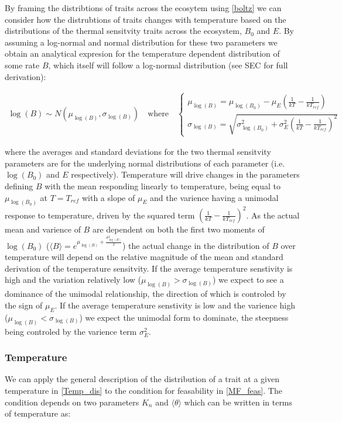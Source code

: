 \documentclass{article}
\begin{document}
By framing the distribtions of traits across the ecosytem using \cref{boltz} we can consider how the distrubtions of traits changes with temperature based on the distributions of the thermal sensitvity traits across the ecosystem, $B_0$ and $E$. By assuming a log-normal and normal distribution for these two parameters we obtain an analytical expresion for the temperature dependent distribution of some rate $B$, which itself will follow a log-normal distribution (see SEC for full derivation):

\begin{align}
  \log(B) \sim N(\mu_{\log(B)},\sigma_{\log(B)}) \quad \text{where} \quad
    \begin{cases}
      \mu_{\log(B)} = \mu_{\log(B_0)} - \mu_E \left(\frac{1}{k T} - \frac{1}{k T_{ref}} \right)
      \\
      \sigma_{\log(B)} =\sqrt{\sigma_{\log(B_0)}^2 + \sigma_E^2 \left(\frac{1}{kT} - \frac{1}{kT_{ref}} \right)^2} \label{Temp_dis}
      \end{cases}
\end{align}

where the averages and standard deviations for the two thermal sensitvity parameters are for the underlying normal distributions of each parameter (i.e. $\log(B_0)$ and $E$ respectively). Temperature will drive changes in the parameters defining $B$ with the mean responding linearly to temperature, being equal to $\mu_{\log(B_0)}$ at $T = T_{ref}$ with a slope of $\mu_E$ and the varience having a unimodal response to temperature, driven by the squared term $\left(\frac{1}{kT} - \frac{1}{kT_{ref}} \right)^2$. As the actual mean and varience of $B$ are dependent on both the first two moments of $\log(B_0)$ ($\langle B \rangle = e^{\mu_{\log(B)} + \frac{\sigma_{\log(B)}^2}{2} }$)  the actual change in the distribution of $B$ over temperature will depend on the relative magnitude of the mean and standard derivation of the temperature sensitvity. If the average temperature senstivity is high and the variation relatively low ($\mu_{\log(B)} > \sigma_{\log(B)}$) we expect to see a dominance of the unimodal relationship, the direction of which is controled by the sign of $\mu_E$. If the average temperature senstivity is low and the varience high ($\mu_{\log(B)} < \sigma_{\log(B)}$) we expect the unimodal form to dominate, the steepness being controled by the varience term $\sigma_E^2$.

\subsubsection{Temperature}
We can apply the general description of the distribution of a trait at a given temperature in \cref{Temp_dis} to the condition for feasability in \cref{MF_feas}. The condition depends on two parameters $K_n$ and $\langle \theta \rangle$ which can be written in terms of temperature as:
\end{document}
